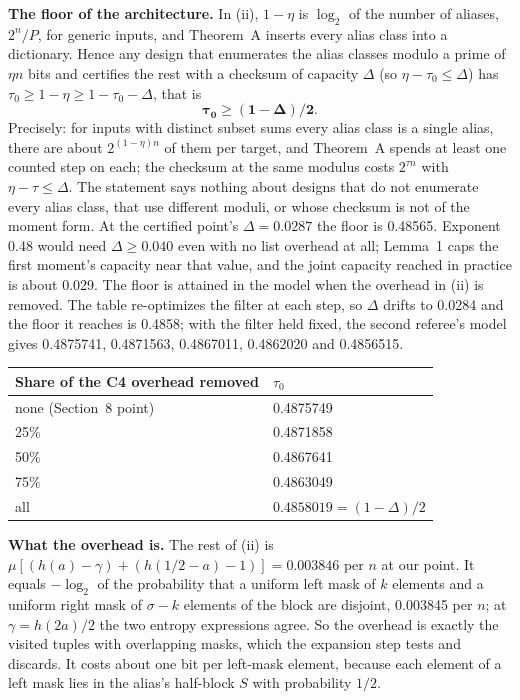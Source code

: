 \documentclass[11pt]{article}
\theoremstyle{plain}
\begin{document}
\textbf{The floor of the architecture.} In (ii), $1 - \eta$ is $\log_2$ of the number of aliases, $2^n/P$, for generic inputs, and Theorem~A inserts every alias class into a dictionary. Hence any design that enumerates the alias classes modulo a prime of $\eta n$ bits and certifies the rest with a checksum of capacity $\Delta$ (so $\eta - \tau_0 \le \Delta$) has $\tau_0 \ge 1 - \eta \ge 1 - \tau_0 - \Delta$, that is
\[
\boldsymbol{\tau_0 \ge (1 - \Delta)/2.}
\]
Precisely: for inputs with distinct subset sums every alias class is a single alias, there are about $2^{(1-\eta)n}$ of them per target, and Theorem~A spends at least one counted step on each; the checksum at the same modulus costs $2^{\tau n}$ with $\eta - \tau \le \Delta$. The statement says nothing about designs that do not enumerate every alias class, that use different moduli, or whose checksum is not of the moment form. At the certified point's $\Delta = 0.0287$ the floor is 0.48565. Exponent 0.48 would need $\Delta \ge 0.040$ even with no list overhead at all; Lemma~1 caps the first moment's capacity near that value, and the joint capacity reached in practice is about 0.029. The floor is attained in the model when the overhead in (ii) is removed. The table re-optimizes the filter at each step, so $\Delta$ drifts to 0.0284 and the floor it reaches is 0.4858; with the filter held fixed, the second referee's model gives 0.4875741, 0.4871563, 0.4867011, 0.4862020 and 0.4856515.

\begin{center}
\small
\begin{tabular}{ll}
\toprule
Share of the C4 overhead removed & $\tau_0$ \\
\midrule
none (Section~8 point) & 0.4875749 \\
25\% & 0.4871858 \\
50\% & 0.4867641 \\
75\% & 0.4863049 \\
all & $0.4858019 = (1 - \Delta)/2$ \\
\bottomrule
\end{tabular}
\end{center}

\textbf{What the overhead is.} The rest of (ii) is $\mu[(h(a) - \gamma) + (h(1/2 - a) - 1)] = 0.003846$ per $n$ at our point. It equals $-\log_2$ of the probability that a uniform left mask of $k$ elements and a uniform right mask of $\sigma - k$ elements of the block are disjoint, 0.003845 per $n$; at $\gamma = h(2a)/2$ the two entropy expressions agree. So the overhead is exactly the visited tuples with overlapping masks, which the expansion step tests and discards. It costs about one bit per left-mask element, because each element of a left mask lies in the alias's half-block $S$ with probability $1/2$.
\end{document}
